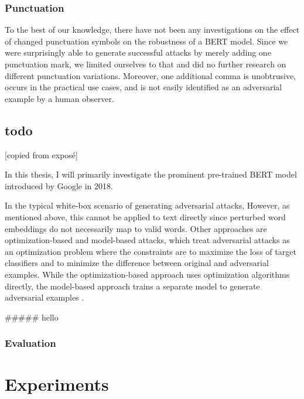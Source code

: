 \subsubsection{Punctuation}
To the best of our knowledge, there have not been any investigations on the effect of changed punctuation symbols on the robustness of a BERT model. Since we were surprisingly able to generate successful attacks by merely adding one punctuation mark, we limited ourselves to that and did no further research on different punctuation variations. Moreover, one additional comma is unobtrusive, occurs in the practical use cases, and is not easily identified as an adversarial example by a human observer.

\subsection{todo}


 [copied from exposé]

In this thesis, I will primarily investigate the prominent pre-trained BERT model introduced by Google in 2018.



In the typical white-box scenario of generating adversarial attacks,  However, as mentioned above, this cannot be applied to text directly since perturbed word embeddings do not necessarily map to valid words. Other approaches are optimization-based and model-based attacks, which treat adversarial attacks as an optimization problem where the constraints are to maximize the loss of target classifiers and to minimize the difference between original and adversarial examples. While the optimization-based approach uses optimization algorithms directly, the model-based approach trains a separate model to generate adversarial examples \cite{xu2020elephant}.






##### hello




\subsubsection{Evaluation}


\section{Experiments}


